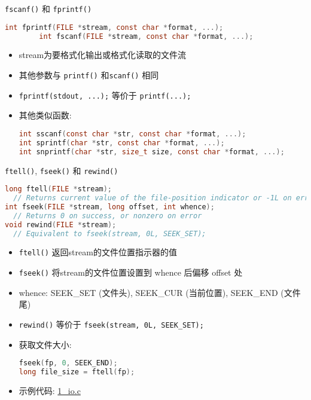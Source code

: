\begin{frame}[fragile]{\texttt{fscanf()} 和 \texttt{fprintf()}}
    \scriptsize
    \begin{lstlisting}[language=c]
        int fprintf(FILE *stream, const char *format, ...);
        int fscanf(FILE *stream, const char *format, ...);
    \end{lstlisting}
    \small
    \begin{itemize}[<+- | alert@+>]
        \item stream为要格式化输出或格式化读取的文件流
        \item 其他参数与 \texttt{printf()} 和\texttt{scanf()} 相同
        \item \texttt{fprintf(stdout, ...);} 等价于 \texttt{printf(...);}
        \item 其他类似函数:
        \scriptsize
        \begin{lstlisting}[language=c]
int sscanf(const char *str, const char *format, ...);
int sprintf(char *str, const char *format, ...);
int snprintf(char *str, size_t size, const char *format, ...);
        \end{lstlisting}
    \end{itemize}
\end{frame}

\begin{frame}[fragile]{\texttt{ftell()}, \texttt{fseek()} 和 \texttt{rewind()}}
    \scriptsize
    \begin{lstlisting}[language=c]
long ftell(FILE *stream);
  // Returns current value of the file-position indicator or -1L on error
int fseek(FILE *stream, long offset, int whence);
  // Returns 0 on success, or nonzero on error
void rewind(FILE *stream);
  // Equivalent to fseek(stream, 0L, SEEK_SET);
    \end{lstlisting}
    \small
    \begin{itemize}[<+- | alert@+>]
        \item \texttt{ftell()} 返回stream的文件位置指示器的值
        \item \texttt{fseek()} 将stream的文件位置设置到 whence 后偏移 offset 处
        \item whence: SEEK\_SET (文件头), SEEK\_CUR (当前位置), SEEK\_END (文件尾)
        \item \texttt{rewind()} 等价于 \texttt{fseek(stream, 0L, SEEK\_SET);}
        \item 获取文件大小:
        \scriptsize\begin{lstlisting}[language=c]
fseek(fp, 0, SEEK_END);
long file_size = ftell(fp);
        \end{lstlisting}
        \item 示例代码: \href{http://problemoverflow.top/download/io.zip}{1\_io.c}
    \end{itemize}
\end{frame}